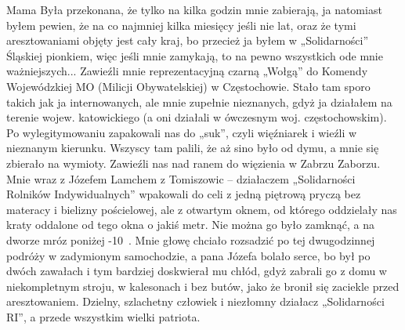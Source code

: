 Mama Była przekonana, że tylko na kilka godzin mnie zabierają, ja natomiast byłem pewien, że na co najmniej kilka miesięcy jeśli nie lat, oraz że tymi aresztowaniami objęty jest cały kraj, bo przecież ja byłem w „Solidarności” Śląskiej pionkiem, więc jeśli mnie zamykają, to na pewno wszystkich ode mnie ważniejszych... Zawieźli mnie reprezentacyjną czarną „Wołgą”  do Komendy Wojewódzkiej MO (Milicji Obywatelskiej) w Częstochowie. Stało tam sporo takich jak ja internowanych, ale mnie zupełnie nieznanych, gdyż ja działałem na terenie wojew. katowickiego (a oni działali w ówczesnym woj. częstochowskim). Po wylegitymowaniu zapakowali nas do „suk”, czyli więźniarek i wieźli w nieznanym kierunku. Wszyscy tam palili, że aż sino było od dymu, a mnie się zbierało na wymioty. Zawieźli nas nad ranem do więzienia w Zabrzu Zaborzu. Mnie wraz z Józefem Lamchem z Tomiszowic – działaczem „Solidarności Rolników Indywidualnych” wpakowali do celi z jedną piętrową pryczą bez materacy i bielizny pościelowej, ale z otwartym oknem, od którego oddzielały nas kraty oddalone od tego okna o jakiś metr. Nie można go było zamknąć, a na dworze mróz poniżej -10~\textcelsius. Mnie głowę chciało rozsadzić po tej dwugodzinnej podróży w zadymionym samochodzie, a pana Józefa bolało serce, bo był po dwóch zawałach i tym bardziej doskwierał mu chłód, gdyż zabrali go z domu w niekompletnym stroju, w kalesonach i bez butów, jako że bronił się zaciekle przed aresztowaniem. Dzielny, szlachetny człowiek i niezłomny działacz „Solidarności RI”, a przede wszystkim wielki patriota.

